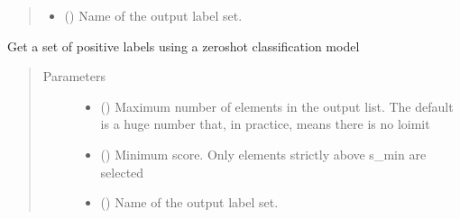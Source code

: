 \documentclass[letterpaper,10pt,english]{sphinxmanual}
\begin{document}
\begin{fulllineitems}
\begin{fulllineitems}
\begin{quote}
\begin{description}
\begin{itemize}
\item {} 
\sphinxAtStartPar
{} () \textendash{} Name of the output label set.

\end{itemize}

\end{description}\end{quote}

\end{fulllineitems}


\begin{fulllineitems}
\label{\detokenize{dc_task_manager:src.task_manager.TaskManager.get_labels_by_zeroshot}}
\sphinxAtStartPar
Get a set of positive labels using a zero\sphinxhyphen{}shot classification model
\begin{quote}\begin{description}
\item[{Parameters}] \leavevmode\begin{itemize}
\item {} 
\sphinxAtStartPar
{} () \textendash{} Maximum number of elements in the output list. The default is
a huge number that, in practice, means there is no loimit

\item {} 
\sphinxAtStartPar
{} () \textendash{} Minimum score. Only elements strictly above s\_min are selected

\item {} 
\sphinxAtStartPar
{} () \textendash{} Name of the output label set.

\end{itemize}

\end{description}\end{quote}


\end{fulllineitems}
\end{fulllineitems}
\end{document}

